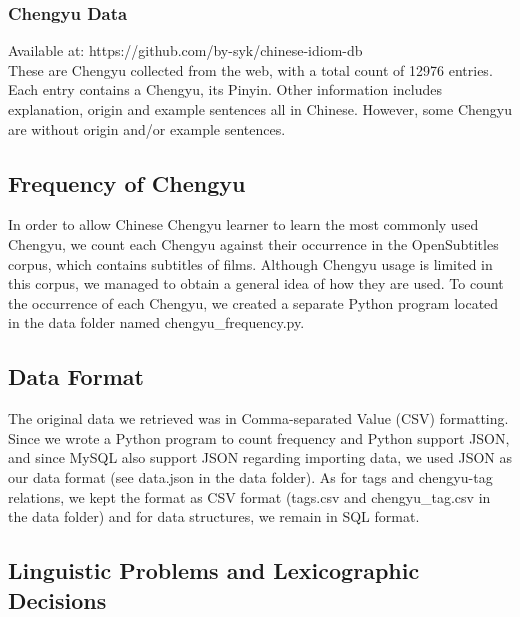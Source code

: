 \documentclass[11pt]{article} %
\begin{document}
\subsubsection{Chengyu Data}
Available at: https://github.com/by-syk/chinese-idiom-db\\
These are Chengyu collected from the web, with a total count of 12976 entries. Each entry contains a Chengyu, its Pinyin. Other information includes explanation, origin and example sentences all in Chinese. However, some Chengyu are without origin and/or example sentences.

\subsection{Frequency of Chengyu}
\indent In order to allow Chinese Chengyu learner to learn the most commonly used Chengyu, we count each Chengyu against their occurrence in the OpenSubtitles corpus, which contains subtitles of films. Although Chengyu usage is limited in this corpus, we managed to obtain a general idea of how they are used. To count the occurrence of each Chengyu, we created a separate Python program located in the data folder named chengyu\_frequency.py.

\subsection{Data Format}
\indent The original data we retrieved was in Comma-separated Value (CSV) formatting. Since we wrote a Python program to count frequency and Python support JSON, and since MySQL also support JSON regarding importing data, we used JSON as our data format (see data.json in the data folder). As for tags and chengyu-tag relations, we kept the format as CSV format (tags.csv and chengyu\_tag.csv in the data folder) and for data structures, we remain in SQL format.

\subsection{Linguistic Problems and Lexicographic Decisions}
\end{document}
